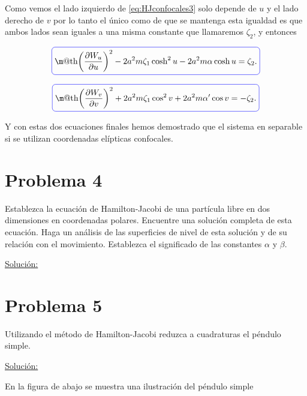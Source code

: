 \documentclass[a4paper,10pt]{article}
\makeatletter
\numberwithin{equation}{section}
\newcommand*{\boxcolor}{blue}
\renewcommand{\boxed}[1]{\textcolor{\boxcolor}{%
\tikz[baseline={([yshift=-1ex]current bounding box.center)}] \node [rectangle, minimum width=1ex,rounded corners,draw] {\normalcolor\m@th$\displaystyle#1$};}}
\makeatother
\begin{document}
Como vemos el lado izquierdo de \eqref{eq:HJconfocales3} solo depende de $u$ y 
el lado derecho de $v$ por lo tanto el único como de que se mantenga esta igualdad 
es que ambos lados sean iguales a una misma constante que llamaremos $\zeta_2$, 
y entonces 

\begin{equation}
 \boxed{\left(\frac{\partial W_u}{\partial u} \right)^2 - 2a^2m\zeta_1\cosh^2{u} - 
 2a^2m\alpha\cosh{u} = \zeta_2.}
\end{equation}

\begin{equation}
 \boxed{ \left(\frac{\partial W_v}{\partial v} \right)^2 + 2a^2m\zeta_1\cos^2{v} + 
 2a^2m\alpha'\cos{v} = - \zeta_2.}
\end{equation}

\vspace{.2cm}

Y con estas dos ecuaciones finales hemos demostrado que el sistema en separable 
si se utilizan coordenadas elípticas confocales.

\section{Problema 4}

Establezca la ecuación de Hamilton-Jacobi de una partícula libre en dos dimensiones 
en coordenadas polares. Encuentre una solución completa de esta ecuación. Haga un 
análisis de las superficies de nivel de esta solución y de su relación con el movimiento. 
Establezca el significado de las constantes $\alpha$ y $\beta$.

\vspace{.3cm}

\underline{Solución:} \vspace{.3cm}

\section{Problema 5}

Utilizando el método de Hamilton-Jacobi reduzca a cuadraturas el péndulo simple. 

\vspace{.3cm}

\underline{Solución:} \vspace{.3cm}

En la figura de abajo se muestra una ilustración del péndulo simple
\end{document}
